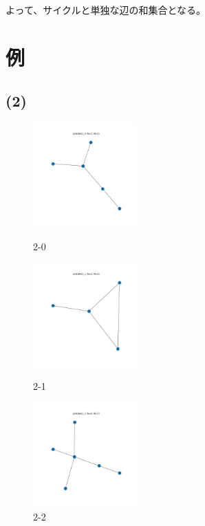 \documentclass[a4paper, 10pt, dvipdfmx]{jlreq}
\begin{document}
よって、サイクルと単独な辺の和集合となる。

\section{例}

\subsection*{(2)}

\begin{figure}[htbp]
  \begin{minipage}{0.33\hsize}
    \begin{center}
      \includegraphics[width=40mm]{img_5/problem2_0.png}
    \end{center}
    \caption{2-0}
  \end{minipage}
  \begin{minipage}{0.33\hsize}
    \begin{center}
      \includegraphics[width=40mm]{img_5/problem2_1.png}
    \end{center}
    \caption{2-1}
  \end{minipage}
  \begin{minipage}{0.33\hsize}
    \begin{center}
      \includegraphics[width=40mm]{img_5/problem2_2.png}
    \end{center}
    \caption{2-2}
  \end{minipage}
\end{figure}
\end{document}
